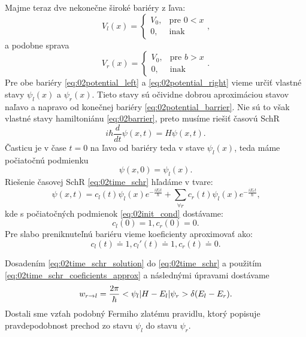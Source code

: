 Majme teraz dve nekonečne široké bariéry z ľava:
\begin{equation}
 \label{eq:02potential_left}
 V_l(x)=
 \begin{cases}
    V_0,& \text{pre } 0<x\\
    0,              & \text{inak}
\end{cases}\text{,}
\end{equation}
a podobne sprava
 \begin{equation}
 \label{eq:02potential_right}
 V_r(x)=
 \begin{cases}
    V_0,& \text{pre } b>x\\
    0,              & \text{inak}
\end{cases}\text{.}
\end{equation}
Pre obe bariéry \eqref{eq:02potential_left} a \eqref{eq:02potential_right} vieme určiť 
vlastné stavy $\psi_{l}(x)$ a $\psi_{r}(x)$. Tieto stavy sú očividne dobrou aproximáciou 
stavov naľavo a napravo od konečnej bariéry \eqref{eq:02potential_barrier}. Nie sú to však 
vlastné stavy hamiltoniánu \eqref{eq:02barrier}, preto musíme riešiť časovú SchR 
\begin{equation}
 \label{eq:02time_schr}
 i\hbar \frac{d}{dt}\psi(x,t)=\hat{H} \psi(x,t)\text{.}
\end{equation} 
Časticu je v čase $t=0$ na ľavo od bariéry teda v stave $\psi_l(x)$, teda máme počiatočnú 
podmienku 
\begin{equation}
 \label{eq:02init_cond} 
 \psi(x,0)=\psi_l(x)\text{.}
\end{equation}
Riešenie časovej SchR \eqref{eq:02time_schr} hľadáme v tvare:
\begin{equation}
 \label{eq:02time_schr_solution}
 \psi(x,t)=c_l(t)\psi_l(x)e^{-\frac{iE_l t}{\hbar}}+\sum_{\forall r} c_r(t)\psi_l(x)e^{-\frac{iE_r t}
{\hbar}}\text{,}
\end{equation}  
kde s počiatočných podmienok \eqref{eq:02init_cond} dostávame:
\begin{equation}
 \label{eq:02time_schr_coeficients} 
c_l(0)=1 , c_r(0)=0 \text{.}
 \end{equation} 
 Pre slabo preniknuteľnú bariéru vieme koeficienty aproximovať ako:
 \begin{equation}
 \label{eq:02time_schr_coeficients_approx} 
c_l(t)\doteq1,c_l'(t)\doteq1 , c_r(t)\doteq0 \text{.}
 \end{equation} 
 
Dosadením \eqref{eq:02time_schr_solution}  do \eqref{eq:02time_schr} a použitím 
\eqref{eq:02time_schr_coeficients_approx} 
a následnými úpravami  dostávame
\begin{equation}
 \label{eq:02golden_rule}
 w_{r\to l}=\frac{2\pi}{\hbar} <\psi_l|H-E_l|\psi_r>\delta(E_l-E_r)\text{.}
\end{equation} 
Dostali sme vzťah podobný Fermiho zlatému pravidlu, ktorý popisuje pravdepodobnost 
prechod zo stavu $\psi_l$  do stavu $\psi_r$. 

